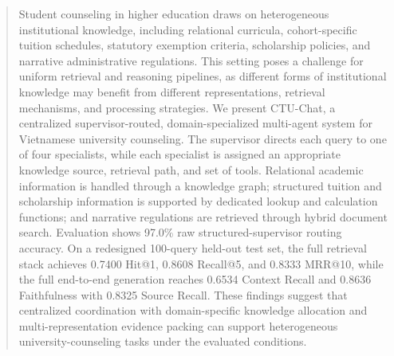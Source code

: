 \begin{abstract}
Student counseling in higher education draws on heterogeneous institutional knowledge, including relational curricula, cohort-specific tuition schedules, statutory exemption criteria, scholarship policies, and narrative administrative regulations. This setting poses a challenge for uniform retrieval and reasoning pipelines, as different forms of institutional knowledge may benefit from different representations, retrieval mechanisms, and processing strategies. We present CTU-Chat, a centralized supervisor-routed, domain-specialized multi-agent system for Vietnamese university counseling. The supervisor directs each query to one of four specialists, while each specialist is assigned an appropriate knowledge source, retrieval path, and set of tools. Relational academic information is handled through a knowledge graph; structured tuition and scholarship information is supported by dedicated lookup and calculation functions; and narrative regulations are retrieved through hybrid document search. Evaluation shows 97.0\% raw structured-supervisor routing accuracy. On a redesigned 100-query held-out test set, the full retrieval stack achieves 0.7400 Hit@1, 0.8608 Recall@5, and 0.8333 MRR@10, while the full end-to-end generation reaches 0.6534 Context Recall and 0.8636 Faithfulness with 0.8325 Source Recall. These findings suggest that centralized coordination with domain-specific knowledge allocation and multi-representation evidence packing can support heterogeneous university-counseling tasks under the evaluated conditions.

\end{abstract}
